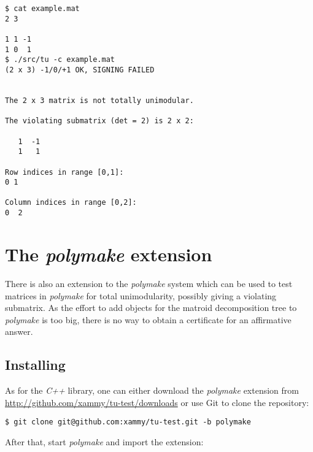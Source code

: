 \documentclass[12pt]{article}
\newcommand{\Cpp}{{\em C++ }}
\newcommand{\Polymake}{{\em polymake }}
\begin{document}
{\tiny
{}
\begin{lstlisting}
$ cat example.mat 
2 3

1 1 -1
1 0  1
$ ./src/tu -c example.mat 
(2 x 3) -1/0/+1 OK, SIGNING FAILED


The 2 x 3 matrix is not totally unimodular.

The violating submatrix (det = 2) is 2 x 2:

   1  -1
   1   1

Row indices in range [0,1]:
0 1

Column indices in range [0,2]:
0  2 

\end{lstlisting}}

\section{The \Polymake extension }

There is also an extension to the \Polymake \cite{Polymake} system which can be used to test matrices in \Polymake
for total unimodularity, possibly giving a violating submatrix. As the effort to add objects for
the matroid decomposition tree to \Polymake is too big, there is no way to obtain a certificate for
an affirmative answer.

\subsection{Installing}

As for the \Cpp library, one can either download the \Polymake extension from 
\url{http://github.com/xammy/tu-test/downloads} or use Git to clone the repository:

{\tiny
{}
\begin{lstlisting}
$ git clone git@github.com:xammy/tu-test.git -b polymake
\end{lstlisting}}

After that, start \Polymake and import the extension:
\end{document}
